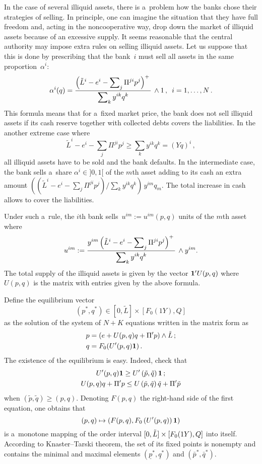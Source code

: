 \begin{multicols}{2}
In the case of several illiquid assets,  there is a~problem how the banks chose 
their strategies of selling. In principle, one can imagine the situation that 
they have  full freedom and, acting in the noncooperative way, drop down the 
market of  illiquid assets because of an excessive supply. It seems reasonable 
that the central authority may  impose extra rules on selling illiquid assets. 
Let us suppose that this is done by prescribing that the bank~$i$ must sell all 
assets in the same proportion~$\alpha^{i}$:
\begin{equation*}
\alpha^i(q)=\displaystyle\frac{\displaystyle \left(\tilde L^i -e^i - \sum\nolimits_j\Pi^{ji}p^j \right)^+\mathstrut}{\displaystyle  \sum\nolimits_k  y^{ik} q^k\mathstrut}\,\wedge 1\,,\enskip i=1,\dots, N\,.
\end{equation*}
This formula means that for a~fixed market price, the bank does not sell illiquid 
assets
if its  cash reserve together with collected debts covers the liabilities.
In the another extreme case where
$$
\tilde L^i -e^i - \sum\limits_j\Pi^{ji}p^j \ge \sum\limits_k y^{ik} q^k=(Yq)^i\,,
$$
all illiquid assets have to be sold and the bank defaults. In the intermediate
case, the bank sells a~share $\alpha^i\in ]0,1[$ of the $m$th asset adding to its 
cash an extra amount
$(({\tilde L^i -e^i - \sum\nolimits_j\Pi^{ji}p^j})/{\sum\nolimits_k y^{ik} 
q^k})\,y^{im}q_m$.
The total increase in cash allows to cover the liabilities.

Under such a~rule, the  $i$th bank sells~$u^{im}:=u^{im}(p,q)$ units of the $m$th asset where
\begin{equation*}
u^{im}
{}:=\displaystyle\frac{\displaystyle y^{im}\left(\tilde L^i -e^i - \sum\nolimits_j\Pi^{ji}p^j 
\right)^+\mathstrut}{\displaystyle  \sum\nolimits_k y^{ik} q^k\mathstrut}\,\wedge y^{im}.
\end{equation*}
The total supply of the illiquid assets is given by the vector ${\bf 1}'U(p,q)$ 
where
$U(p,q)$ is the matrix with entries given by the above formula.

Define the equilibrium vector 
$$
\left(p^*,q^*\right)\in \left[0,\tilde L\right] \times \left[ F_0(1Y),Q\right]
$$ 
as 
the solution of the system of $N+K$ equations written in the matrix form as
\begin{align}
\label{firstM}
p&=(e+U(p,q)q+\Pi'p)\wedge \tilde L\,;\\
\label{secondM}
q&=F_0(U'(p,q){\bf 1})\,.
\end{align}
The existence of the equilibrium is easy. Indeed,
check that 
\begin{gather*}
U'(p,q){\bf 1}\ge U'\left(\tilde p,\tilde q\right){\bf 1}\,;\\
U(p,q)q+\Pi'p\le  U\left(\tilde p,\tilde q\right)\tilde q+\Pi'\tilde p
\end{gather*}
when $(\tilde p,\tilde q)\ge (p,q)$. Denoting  $F(p,q)$ the right-hand side 
of the first equation, one obtains that  
$$
(p,q)\mapsto \left(F(p,q),F_0\left(U'(p,q)\right){\bf  1}\right)
$$ 
is a~monotone  mapping of the order interval $[0,\tilde L]\linebreak\times [ F_0(1Y),Q]$ into 
itself.  According to Knaster--Tarski theorem, the set of its fixed points is nonempty 
and contains the minimal and maximal elements $(\underline p^*, \underline q^*)$ 
and $(\bar p^*,\bar q^*)$.


\end{multicols}

